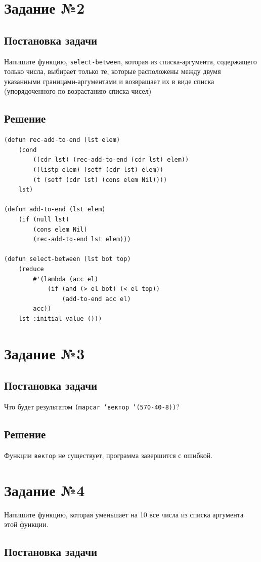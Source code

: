 \documentclass[12pt]{report}
\begin{document}
\section*{Задание №2}
\subsection*{Постановка задачи}
Напишите функцию, \texttt{select-between}, которая из списка-аргумента, содержащего только числа, выбирает только те, которые расположены между двумя указанными границами-аргументами и возвращает их в виде списка (упорядоченного по возрастанию списка чисел)

\subsection*{Решение}
\begin{lstlisting}
(defun rec-add-to-end (lst elem)
	(cond 
		((cdr lst) (rec-add-to-end (cdr lst) elem))
		((listp elem) (setf (cdr lst) elem))
		(t (setf (cdr lst) (cons elem Nil))))
	lst)

(defun add-to-end (lst elem)
	(if (null lst)
		(cons elem Nil)
		(rec-add-to-end lst elem)))

(defun select-between (lst bot top)
	(reduce
		#'(lambda (acc el)
			(if (and (> el bot) (< el top))
				(add-to-end acc el)
		acc))
	lst :initial-value ()))
\end{lstlisting}

\section*{Задание №3}
\subsection*{Постановка задачи}
Что будет результатом \texttt{(mapcar 'вектор '(570-40-8))}?

\subsection*{Решение}
Функции \texttt{вектор} не существует, программа завершится с ошибкой.

\section*{Задание №4}
Напишите функцию, которая уменьшает на 10 все числа из списка аргумента этой функции.

\subsection*{Постановка задачи}
\end{document}
